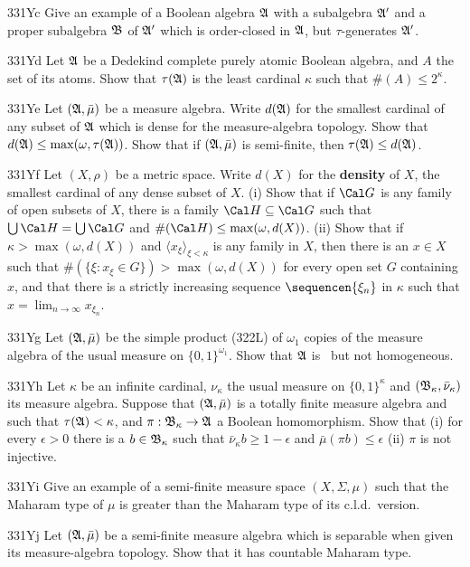 {\spheader 331Yc Give an example of a Boolean algebra $\frak A$
with a subalgebra $\frak A'$ and a proper subalgebra $\frak B$ of
$\frak A'$ which is order-closed in $\frak A$, but $\tau$-generates $\frak A'$.

\spheader 331Yd Let $\frak A$ be a Dedekind complete purely atomic
Boolean algebra, and $A$ the set of its atoms.   Show that
$\tau(\frak A)$ is the least
cardinal $\kappa$ such that $\#(A)\le 2^{\kappa}$.

\spheader 331Ye Let $(\frak A,\bar\mu)$ be a measure algebra.   Write
$d(\frak A)$ for the smallest cardinal of any subset of $\frak A$ which
is dense for the measure-algebra topology.   Show that
$d(\frak A)\le\max(\omega,\tau(\frak A))$.   Show that if
$(\frak A,\bar\mu)$ is semi-finite, then $\tau(\frak A)\le d(\frak A)$.

\spheader 331Yf Let $(X,\rho)$ be a metric space.   Write $d(X)$ for the
{\bf density} of $X$, the smallest cardinal of any dense subset of $X$.
(i) Show that if $\Cal G$ is any family of open subsets of $X$, there is
a family $\Cal H\subseteq\Cal G$ such that $\bigcup\Cal H=\bigcup\Cal G$
and $\#(\Cal H)\le\max(\omega,d(X))$.   (ii) Show that if
$\kappa>\max(\omega,d(X))$ and $\langle x_{\xi}\rangle_{\xi<\kappa}$ is
any family in $X$, then there is an $x\in X$ such that
$\#(\{\xi:x_{\xi}\in G\})>\max(\omega,d(X))$ for every open set $G$
containing $x$, and that there is a strictly increasing
sequence $\sequencen{\xi_n}$ in $\kappa$ such that $x=\lim_{n\to\infty}x_{\xi_n}$.

\spheader 331Yg Let $(\frak A,\bar\mu)$ be the simple product (322L) of
$\omega_1$ copies of the measure algebra of the usual measure on
$\{0,1\}^{\omega_1}$.   Show that $\frak A$ is \Mth\ but not
homogeneous.

\spheader 331Yh Let $\kappa$ be an infinite cardinal,
$\nu_{\kappa}$ the usual measure on $\{0,1\}^{\kappa}$ and
$(\frak B_{\kappa},\bar\nu_{\kappa})$ its measure algebra.   Suppose that
$(\frak A,\bar\mu)$ is a totally finite measure algebra and such that
$\tau(\frak A)<\kappa$, and $\pi:\frak B_{\kappa}\to\frak A$
a Boolean homomorphism.   Show that (i) for every $\epsilon>0$ there is a
$b\in\frak B_{\kappa}$ such that $\bar\nu_{\kappa}b\ge 1-\epsilon$ and
$\bar\mu(\pi b)\le\epsilon$ (ii) $\pi$ is not injective.

\spheader 331Yi Give an example of a semi-finite measure space
$(X,\Sigma,\mu)$ such that the Maharam type of $\mu$ is greater than the
Maharam type of its c.l.d.\ version.

\spheader 331Yj
Let $(\frak A,\bar\mu)$ be a semi-finite measure algebra
which is separable when given
its measure-algebra topology.   Show that it has countable Maharam type.
}%

